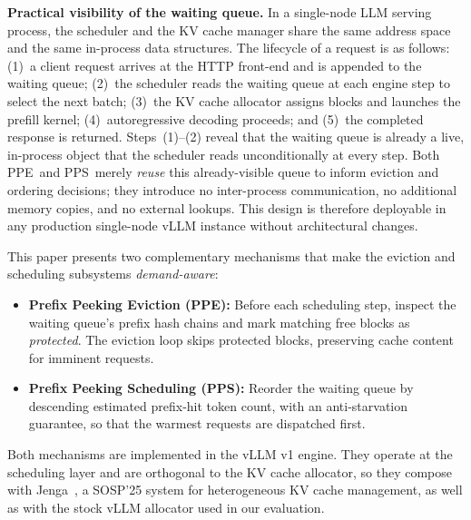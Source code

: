 \documentclass[journal]{IEEEtran}
\newcommand{\ppe}{\textsc{PPE}}
\newcommand{\pps}{\textsc{PPS}}
\newcommand{\jenga}{Jenga}
\begin{document}
\textbf{Practical visibility of the waiting queue.}
In a single-node LLM serving process, the scheduler and the KV cache manager
share the same address space and the same in-process data structures.
The lifecycle of a request is as follows: (1)~a client request arrives at
the HTTP front-end and is appended to the waiting queue; (2)~the scheduler
reads the waiting queue at each engine step to select the next batch;
(3)~the KV cache allocator assigns blocks and launches the prefill kernel;
(4)~autoregressive decoding proceeds; and (5)~the completed response is
returned.
Steps~(1)--(2) reveal that the waiting queue is already a live, in-process
object that the scheduler reads unconditionally at every step.
Both \ppe\ and \pps\ merely \emph{reuse} this already-visible queue to
inform eviction and ordering decisions; they introduce no inter-process
communication, no additional memory copies, and no external lookups.
This design is therefore deployable in any production single-node vLLM
instance without architectural changes.

This paper presents two complementary mechanisms that make the eviction and
scheduling subsystems \emph{demand-aware}:

\begin{itemize}

\item \textbf{Prefix Peeking Eviction (\ppe):} Before each scheduling step,
inspect the waiting queue's prefix hash chains and mark matching free blocks
as \emph{protected}. The eviction loop skips protected blocks, preserving
cache content for imminent requests.

\item \textbf{Prefix Peeking Scheduling (\pps):} Reorder the waiting queue
by descending estimated prefix-hit token count, with an anti-starvation
guarantee, so that the warmest requests are dispatched first.

\end{itemize}

Both mechanisms are implemented in the vLLM v1 engine.  They operate at the
scheduling layer and are orthogonal to the KV cache allocator, so they
compose with \jenga~\cite{jenga2025}, a SOSP'25 system for heterogeneous KV
cache management, as well as with the stock vLLM allocator used in our
evaluation.
\end{document}

